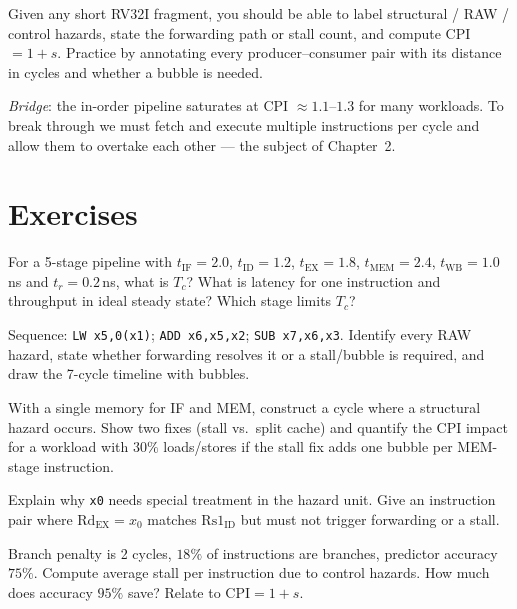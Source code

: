 \begin{remark}
Given any short RV32I fragment, you should be able to label structural / RAW / control hazards, state the forwarding path or stall count, and compute CPI $=1+s$. Practice by annotating every producer--consumer pair with its distance in cycles and whether a bubble is needed.
\end{remark}

\textit{Bridge}: the in-order pipeline saturates at CPI $\approx1.1$--$1.3$ for many workloads. To break through we must fetch and execute multiple instructions per cycle and allow them to overtake each other --- the subject of Chapter~2.


\section{Exercises}
\begin{exercise}For a 5-stage pipeline with $t_{\text{IF}}=2.0$, $t_{\text{ID}}=1.2$, $t_{\text{EX}}=1.8$, $t_{\text{MEM}}=2.4$, $t_{\text{WB}}=1.0$\,ns and $t_r=0.2$\,ns, what is $T_c$? What is latency for one instruction and throughput in ideal steady state? Which stage limits $T_c$?\end{exercise}
\begin{exercise}Sequence: \texttt{LW x5,0(x1)}; \texttt{ADD x6,x5,x2}; \texttt{SUB x7,x6,x3}. Identify every RAW hazard, state whether forwarding resolves it or a stall/bubble is required, and draw the 7-cycle timeline with bubbles.\end{exercise}
\begin{exercise}With a single memory for IF and MEM, construct a cycle where a structural hazard occurs. Show two fixes (stall vs.\ split cache) and quantify the CPI impact for a workload with $30\%$ loads/stores if the stall fix adds one bubble per MEM-stage instruction.\end{exercise}
\begin{exercise}Explain why \texttt{x0} needs special treatment in the hazard unit. Give an instruction pair where $\text{Rd}_{\text{EX}}=x_0$ matches $\text{Rs1}_{\text{ID}}$ but must not trigger forwarding or a stall.\end{exercise}
\begin{exercise}Branch penalty is 2 cycles, $18\%$ of instructions are branches, predictor accuracy $75\%$. Compute average stall per instruction due to control hazards. How much does accuracy $95\%$ save? Relate to $\text{CPI}=1+s$.\end{exercise}
